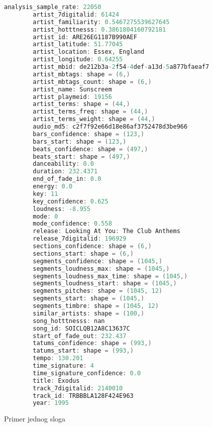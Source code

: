 \begin{figure}[H]
    \lstset{style=mystyle}
    \begin{lstlisting}[language=C, basicstyle=\footnotesize]
        analysis_sample_rate: 22050
        artist_7digitalid: 61424
        artist_familiarity: 0.5467275539627645
        artist_hotttnesss: 0.3861804160792181
        artist_id: ARE26EG1187B990AEF
        artist_latitude: 51.77045
        artist_location: Essex, England
        artist_longitude: 0.64255
        artist_mbid: de212b3a-2f54-4def-a13d-5a877bfaeaf7
        artist_mbtags: shape = (6,)
        artist_mbtags_count: shape = (6,)
        artist_name: Sunscreem
        artist_playmeid: 19156
        artist_terms: shape = (44,)
        artist_terms_freq: shape = (44,)
        artist_terms_weight: shape = (44,)
        audio_md5: c2f7f92e66d18e86af3752478d3be966
        bars_confidence: shape = (123,)
        bars_start: shape = (123,)
        beats_confidence: shape = (497,)
        beats_start: shape = (497,)
        danceability: 0.0
        duration: 232.4371
        end_of_fade_in: 0.0
        energy: 0.0
        key: 11
        key_confidence: 0.625
        loudness: -8.955
        mode: 0
        mode_confidence: 0.558
        release: Looking At You: The Club Anthems
        release_7digitalid: 196929
        sections_confidence: shape = (6,)
        sections_start: shape = (6,)
        segments_confidence: shape = (1045,)
        segments_loudness_max: shape = (1045,)
        segments_loudness_max_time: shape = (1045,)
        segments_loudness_start: shape = (1045,)
        segments_pitches: shape = (1045, 12)
        segments_start: shape = (1045,)
        segments_timbre: shape = (1045, 12)
        similar_artists: shape = (100,)
        song_hotttnesss: nan
        song_id: SOICLQB12A8C13637C
        start_of_fade_out: 232.437
        tatums_confidence: shape = (993,)
        tatums_start: shape = (993,)
        tempo: 130.201
        time_signature: 4
        time_signature_confidence: 0.0
        title: Exodus
        track_7digitalid: 2140010
        track_id: TRBBBLA128F424E963
        year: 1995
    \end{lstlisting}
    \caption{Primer jednog sloga}
    \label{primer:Song}
\end{figure}
